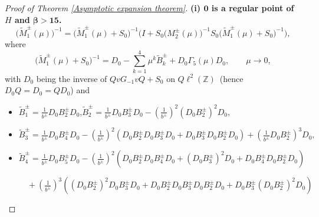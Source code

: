 \documentclass[10pt,a4paper]{amsart}
\newcommand\Z{\mathbb{Z}}
\numberwithin{equation}{section}
\begin{document}
\begin{proof}[Proof of Theorem {\rm\ref{Asymptotic expansion theorem}}]{\bf{(i) ${\bm{0}}$ is a regular point of $H$ and {$\bm{\beta>15}$}.}}
\begin{equation}\label{Relat of M1 tuta and M2}
\big(\widetilde{M}_{1}^{\pm}(\mu)\big)^{-1}=\big(\widetilde{M}_{1}^{\pm}(\mu)+S_0\big)^{-1}\Big(I+S_0\big(M^{\pm}_{2}(\mu)\big)^{-1}S_0\big(\widetilde{M}_{1}^{\pm}(\mu)+S_0\big)^{-1}\Big),
\end{equation}
where
\begin{equation}\label{expre of Bpm tuta}
\big(\widetilde{M}_{1}^{\pm}(\mu)+S_0\big)^{-1}=D_0-\sum\limits_{k=1}^{4}\mu^{k}\widetilde{B}_{k}^{\pm}+D_0\Gamma_5(\mu)D_0,\qquad\mu\rightarrow0,
\end{equation}
with $D_0$ being the inverse of $QvG_{-1}vQ+S_0$ on $Q\ell^2(\Z)$~(hence $D_0Q=D_0=QD_0$) and
\begin{itemize}
\item $\widetilde{B}_{1}^{\pm}=\frac{1}{b^{\pm}}D_0B^{\pm}_2D_0$,\quad$\widetilde{B}_{2}^{\pm}=\frac{1}{b^{\pm}}D_0B^{\pm}_3D_0-\left(\frac{1}{b^{\pm}}\right)^2\left(D_0B^{\pm}_2\right)^2D_0$,
\vskip0.2cm
\item
$\widetilde{B}_{3}^{\pm}=\frac{1}{b^{\pm}}D_0B^{\pm}_4D_0-\left(\frac{1}{b^{\pm}}\right)^2\left(D_0B^{\pm}_2D_0B^{\pm}_3D_0+D_0B^{\pm}_3D_0B^{\pm}_2D_0\right)+\left(\frac{1}{b^{\pm}}D_0B^{\pm}_2\right)^3D_0,$
\vskip0.2cm
\item $\widetilde{B}_{4}^{\pm}=\frac{1}{b^{\pm}}D_0B^{\pm}_5D_0-\left(\frac{1}{b^{\pm}}\right)^2\left(D_0B^{\pm}_2D_0B^{\pm}_4D_0+\left(D_0B^{\pm}_3\right)^2D_0+D_0B^{\pm}_4D_0B^{\pm}_2D_0\right)$

$\quad+\left(\frac{1}{b^{\pm}}\right)^3\left(\left(D_0B^{\pm}_2\right)^2D_0B^{\pm}_3D_0+D_0B^{\pm}_2D_0B^{\pm}_3D_0B^{\pm}_2D_0+D_0B^{\pm}_3\left(D_0B^{\pm}_2\right)^2D_0\right)$


\end{itemize}
\end{proof}
\end{document}
